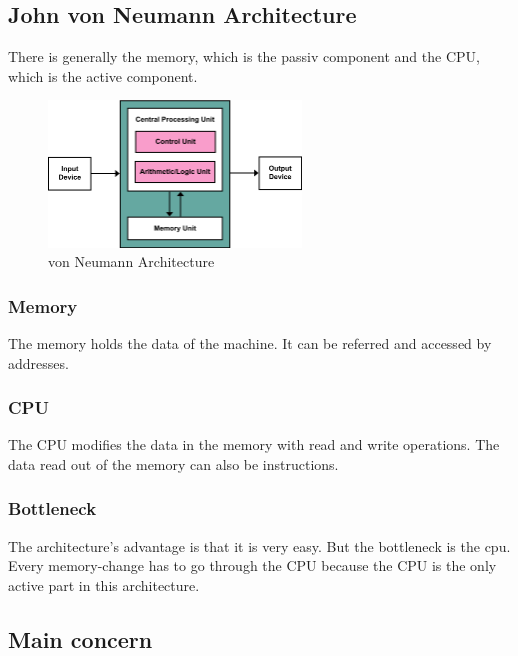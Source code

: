\clearpage
\hypertarget{john-von-neumann-architecture}{%
\subsection{John von Neumann
Architecture}\label{john-von-neumann-architecture}}

There is generally the memory, which is the passiv component and the
CPU, which is the active component.

\begin{figure}[H]
\centering
\includegraphics[width=0.6\textwidth]{figures/vonNeumann.png}
\caption{von Neumann Architecture}
\end{figure}

\hypertarget{memory}{%
\subsubsection{Memory}\label{memory}}

The memory holds the data of the machine. It can be referred and
accessed by addresses.

\hypertarget{cpu}{%
\subsubsection{CPU}\label{cpu}}

The CPU modifies the data in the memory with read and write operations.
The data read out of the memory can also be instructions.

\hypertarget{bottleneck}{%
\subsubsection{Bottleneck}\label{bottleneck}}

The architecture's advantage is that it is very easy. But the bottleneck
is the cpu. Every memory-change has to go through the CPU because the
CPU is the only active part in this architecture.

\hypertarget{main-concern}{%
\subsection{Main concern}\label{main-concern}}

